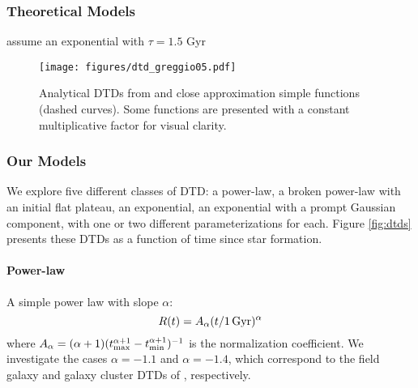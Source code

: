 \documentclass[twocolumn,linenumbers,twocolappendix]{aastex631}
\begin{document}
\subsubsection{Theoretical Models}

\citet{Matteucci1986-SupernovaEnrichment}

\citet{Greggio2005-AnalyticalRates}

\citet{Rajamuthukumar2022-TripleEvolution}

\citet{Schonrich2009-RadialMixing,Weinberg2017-ChemicalEquilibrium} assume an exponential with $\tau=1.5$ Gyr

\begin{figure}
    \centering
    \texttt{[image: figures/dtd\_greggio05.pdf]}
    \caption{Analytical DTDs from \citet[][solid curves]{Greggio2005-AnalyticalRates} and close approximation simple functions (dashed curves). Some functions are presented with a constant multiplicative factor for visual clarity.}
    \label{fig:dtd-greggio05}
\end{figure}

\subsubsection{Our Models}

We explore five different classes of DTD: a power-law, a broken power-law with an initial flat plateau, an exponential, an exponential with a prompt Gaussian component, with one or two different parameterizations for each. Figure \ref{fig:dtds} presents these DTDs as a function of time since star formation.

\paragraph{Power-law} A simple power law with slope $\alpha$:
\begin{equation}
    R(t) = A_\alpha (t/1\,\rm{Gyr})^\alpha
    \label{eq:powerlaw-dtd}
\end{equation}
where $A_\alpha = (\alpha+1)(t_{\rm max}^{\alpha+1} - t_{\rm min}^{\alpha+1})^{-1}$ is the normalization coefficient.
We investigate the cases $\alpha=-1.1$ and $\alpha=-1.4$, which correspond to the field galaxy and galaxy cluster DTDs of \citet{Maoz2017-CosmicDTD}, respectively.
\end{document}
